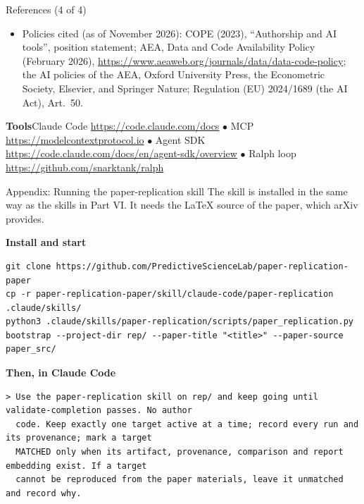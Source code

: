 \documentclass[aspectratio=169,10pt]{beamer}
\newcommand{\filebox}[1]{%
  \vspace{0.5em}\par\noindent{\scriptsize\textcolor{uzhgreydark}{$\triangleright$~\texttt{#1}}}}
\begin{document}
\begin{frame}{References (4 of 4)}
\footnotesize
\begin{itemize}\itemsep3pt
  \item Policies cited (as of November 2026): COPE (2023), ``Authorship and AI tools'', position statement; AEA, Data and Code Availability Policy (February 2026), \url{https://www.aeaweb.org/journals/data/data-code-policy}; the AI policies of the AEA, Oxford University Press, the Econometric Society, Elsevier, and Springer Nature; Regulation (EU) 2024/1689 (the AI Act), Art.\ 50.
\end{itemize}
\vspace{0.6em}
\textbf{Tools}\quad Claude Code \url{https://code.claude.com/docs} $\bullet$ MCP \url{https://modelcontextprotocol.io} $\bullet$ Agent SDK \url{https://code.claude.com/docs/en/agent-sdk/overview} $\bullet$ Ralph loop \url{https://github.com/snarktank/ralph}
\end{frame}

\begin{frame}[fragile]{Appendix: Running the paper-replication skill}
The skill is installed in the same way as the skills in Part VI. It needs the LaTeX source of the paper, which arXiv provides.

\vspace{0.4em}
\textbf{Install and start}
\begin{lstlisting}[style=bash, basicstyle=\scriptsize\ttfamily]
git clone https://github.com/PredictiveScienceLab/paper-replication-paper
cp -r paper-replication-paper/skill/claude-code/paper-replication .claude/skills/
python3 .claude/skills/paper-replication/scripts/paper_replication.py bootstrap --project-dir rep/ --paper-title "<title>" --paper-source paper_src/
\end{lstlisting}
\textbf{Then, in Claude Code}
\begin{lstlisting}[style=prompt, basicstyle=\scriptsize\ttfamily]
> Use the paper-replication skill on rep/ and keep going until validate-completion passes. No author
  code. Keep exactly one target active at a time; record every run and its provenance; mark a target
  MATCHED only when its artifact, provenance, comparison and report embedding exist. If a target
  cannot be reproduced from the paper materials, leave it unmatched and record why.
\end{lstlisting}
\filebox{code/prompts.md, \S 14}
\end{frame}
\end{document}
